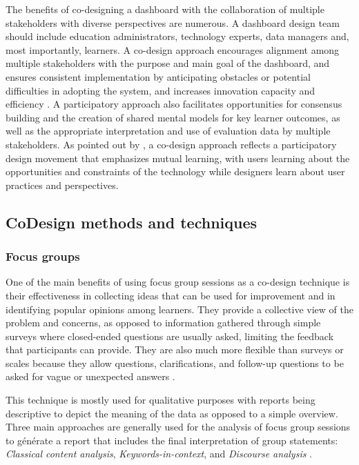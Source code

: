 \documentclass[preprint,12pt]{elsarticle}
\begin{document}
The benefits of co-designing a dashboard with the collaboration of multiple stakeholders with diverse perspectives are numerous. A dashboard design team should include education administrators, technology experts, data managers and, most importantly, learners. A co-design approach encourages alignment among multiple stakeholders with the purpose and main goal of the dashboard, and ensures consistent implementation by anticipating obstacles or potential difficulties in adopting the system, and increases innovation capacity and efficiency \citet{boscardin2018twelve}. A participatory approach also facilitates opportunities for consensus building and the creation of shared mental models for key learner outcomes, as well as the appropriate interpretation and use of evaluation data by multiple stakeholders. As pointed out by \citet{schuler1993participatory}, a co-design approach reflects a participatory design movement that emphasizes mutual learning, with users learning about the opportunities and constraints of the technology while designers learn about user practices and perspectives.

\subsection{CoDesign methods and techniques}


\subsubsection{Focus groups}
One of the main benefits of using focus group sessions as a co-design technique is their effectiveness in collecting ideas that can be used for improvement and in identifying popular opinions among learners.  They provide a collective view of the problem and concerns, as opposed to information gathered through simple surveys where closed-ended questions are usually asked, limiting the feedback that participants can provide. They are also much more flexible than surveys or scales because they allow questions, clarifications, and follow-up questions to be asked for vague or unexpected answers \cite{krueger2014focus}. 

This technique is mostly used for qualitative purposes with reports being descriptive to depict the meaning of the data as opposed to a simple overview. Three main approaches are generally used for the analysis of focus group sessions to générate a report that includes the final interpretation of group
statements: \textit{Classical content analysis}, \textit{Keywords-in-context}, and \textit{Discourse analysis} \cite{prieto2018co}.
\end{document}

